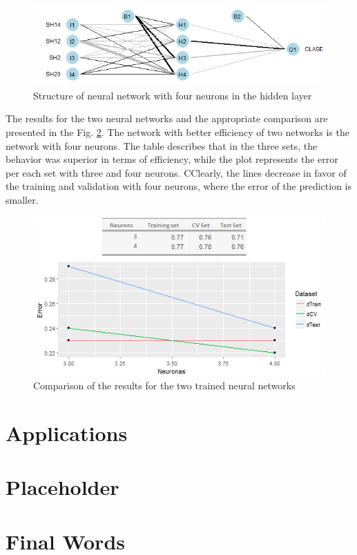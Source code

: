 \documentclass[]{book}
\begin{document}
\begin{figure}[H]

{\centering \includegraphics[width=0.8\linewidth]{images/nn-four-neurons} 

}

\caption{Structure of neural network with four neurons in the hidden layer}\label{fig:nn-four-neurons}
\end{figure}

The results for the two neural networks and the appropriate comparison
are presented in the Fig. \ref{fig:results-of-the-3-4-nn}. The network
with better efficiency of two networks is the network with four neurons.
The table describes that in the three sets, the behavior was superior in
terms of efficiency, while the plot represents the error per each set
with three and four neurons. CClearly, the lines decrease in favor of
the training and validation with four neurons, where the error of the
prediction is smaller.

\begin{figure}[H]

{\centering \includegraphics[width=0.8\linewidth]{images/results-of-the-3-4-nn} 

}

\caption{Comparison of the results for the two trained neural networks}\label{fig:results-of-the-3-4-nn}
\end{figure}

\chapter{Applications}\label{applications}

\chapter{Placeholder}\label{placeholder}

\chapter{Final Words}\label{final-words}


\end{document}
